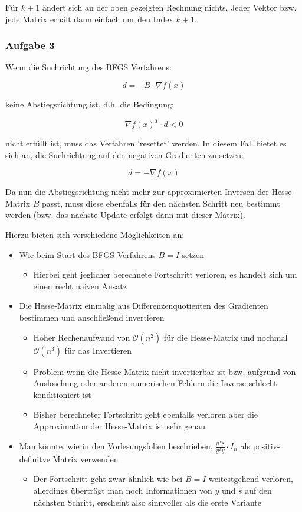 \documentclass[a4paper, 12pt]{report}
\begin{document}
Für $k + 1$ ändert sich an der oben gezeigten Rechnung nichts. Jeder Vektor bzw. jede Matrix erhält dann einfach nur den Index $k + 1$.

\subsubsection{Aufgabe 3}

Wenn die Suchrichtung des BFGS Verfahrens:

$$d = -B\cdot \nabla f(x) $$

keine Abstiegsrichtung ist, d.h. die Bedingung:

$$\nabla f(x)^T \cdot d < 0 $$

nicht erfüllt ist, muss das Verfahren 'resettet' werden. In diesem Fall bietet es sich an, die Suchrichtung auf den
negativen Gradienten zu setzen:

$$d = -\nabla f(x)$$

Da nun die Abstiegsrichtung nicht mehr zur approximierten Inversen der Hesse-Matrix $B$ passt, muss diese ebenfalls für
den nächsten Schritt neu bestimmt werden (bzw. das nächste Update erfolgt dann mit dieser Matrix).\par
Hierzu bieten sich verschiedene Möglichkeiten an:

\begin{itemize}
  \item Wie beim Start des BFGS-Verfahrens $B = I$ setzen
  \begin{itemize}
    \item Hierbei geht jeglicher berechnete Fortschritt verloren, es handelt sich um einen recht naiven Ansatz
  \end{itemize}
  \item Die Hesse-Matrix einmalig aus Differenzenquotienten des Gradienten bestimmen und anschließend invertieren
  \begin{itemize}
    \item Hoher Rechenaufwand von $\mathcal{O}(n^2)$ für die Hesse-Matrix und nochmal $\mathcal{O}(n^3)$ für das Invertieren
    \item Problem wenn die Hesse-Matrix nicht invertierbar ist bzw. aufgrund von Auslöschung oder anderen numerischen Fehlern
    die Inverse schlecht konditioniert ist
    \item Bisher berechneter Fortschritt geht ebenfalls verloren aber die Approximation der Hesse-Matrix ist sehr genau
  \end{itemize}
  \item Man könnte, wie in den Vorlesungsfolien beschrieben,  $\frac{y^Ts}{y^Ty}\cdot I_n$ als positiv-definitve Matrix verwenden
  \begin{itemize}
    \item Der Fortschritt geht zwar ähnlich wie bei $B = I$ weitestgehend verloren, allerdings überträgt man noch Informationen
    von $y$ und $s$ auf den nächsten Schritt, erscheint also sinnvoller als die erste Variante
  \end{itemize}
\end{itemize}
\end{document}
